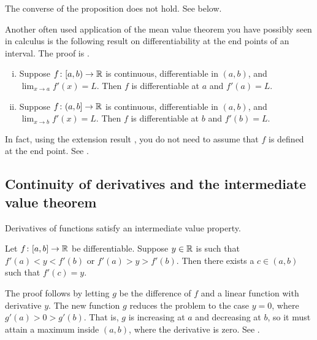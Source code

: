 The converse of the proposition does not hold.  See
 below.

\medskip

Another often used application of the mean value theorem you have possibly
seen in calculus is the following result on differentiability at the
end points of an interval.  The proof is
.

\begin{prop} \label{prop:endpointderivative}
\leavevmode
\begin{enumerate}[(i)]
\item
Suppose $f \colon [a,b) \to {\mathbb{R}}$ is continuous, differentiable in $(a,b)$,
and $\lim_{x \to a} f'(x) = L$.  Then $f$ is differentiable at $a$ and
$f'(a) = L$.
\item
Suppose $f \colon (a,b] \to {\mathbb{R}}$ is continuous, differentiable in $(a,b)$,
and $\lim_{x \to b} f'(x) = L$.  Then $f$ is differentiable at $b$ and
$f'(b) = L$.
\end{enumerate}
\end{prop}

In fact, using the extension result , you do not need to assume
that $f$ is defined at the end point.  See .

\subsection{Continuity of derivatives and the intermediate value theorem}

Derivatives of functions satisfy an
intermediate value property.

\begin{thm}[Darboux] \label{thm:darboux} 
Let $f \colon [a,b] \to {\mathbb{R}}$ be differentiable.  Suppose $y \in {\mathbb{R}}$ is such
that $f'(a) < y < f'(b)$ or
$f'(a) > y > f'(b)$.  Then there exists a $c \in (a,b)$ such that $f'(c) =
y$.
\end{thm}

The proof follows by letting $g$ be the difference of $f$
and a linear function with derivative $y$.
The new function $g$ reduces the problem
to the case $y=0$, where $g'(a) > 0 > g'(b)$.  That is, $g$ is increasing at $a$ and
decreasing at $b$, so it must attain a maximum inside $(a,b)$,
where the derivative is zero.  See .

\begin{myfigureht}
\caption{Idea of the proof of Darboux theorem.\label{darbouxthmfig}}
\end{myfigureht}

